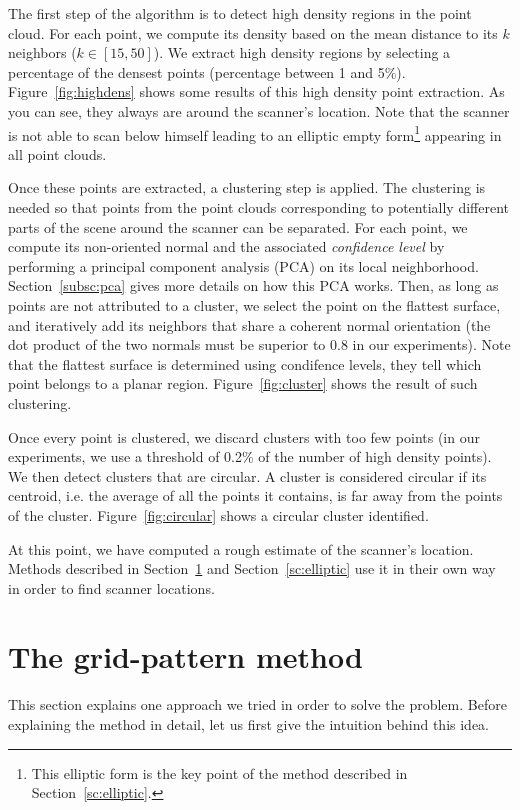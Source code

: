 The first step of the algorithm is to detect high density regions in the point cloud. For each point, we compute its density based on the mean distance to its $k$ neighbors ($k \in [15,50]$). We extract high density regions by selecting a percentage of the densest points (percentage between 1 and 5\%). Figure~\ref{fig:highdens} shows some results of this high density point extraction. As you can see, they always are around the scanner's location. Note that the scanner is not able to scan below
himself leading to an elliptic empty form\footnote{This elliptic form is the key point of the method described in Section~\ref{sc:elliptic}.} appearing in all point clouds.

Once these points are extracted, a clustering step is applied. The clustering is needed so that points from the point clouds corresponding to potentially different parts of the scene around the scanner can be separated. For each point, we compute its non-oriented normal and the associated \emph{confidence level} by performing a principal component analysis (PCA) on its local neighborhood. Section~\ref{subsc:pca} gives more details on how this PCA works. Then, as long as points are not attributed
to a cluster, we select the point on the flattest surface, and iteratively add its neighbors that share a coherent normal orientation (the dot product of the two normals must be superior to 0.8 in our experiments). Note that the  flattest surface is determined using condifence levels, they tell which point belongs to a planar region. Figure~\ref{fig:cluster} shows the result of such clustering.

Once every point is clustered, we discard clusters with too few points (in our experiments, we use a threshold of 0.2\% of the number of high density points). We then detect clusters that are circular. A cluster is considered circular if its centroid, i.e. the average of all the points it contains, is far away from the points of the cluster. Figure~\ref{fig:circular} shows a circular cluster identified.

At this point, we have computed a rough estimate of the scanner's location. Methods described in Section~\ref{sc:grid-pattern} and Section~\ref{sc:elliptic} use it in their own way in order to find scanner locations.



\section{The grid-pattern method}
\label{sc:grid-pattern}
This section explains one approach we tried in order to solve the problem. Before explaining the method in detail, let us first give the intuition behind this idea.

